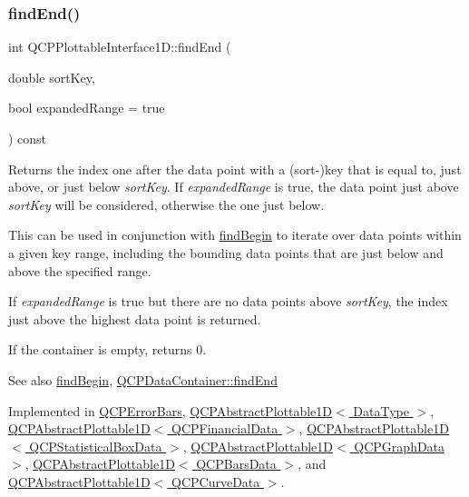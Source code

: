 \subsubsection{\texorpdfstring{find\+End()}{findEnd()}}
{\footnotesize\ttfamily int Q\+C\+P\+Plottable\+Interface1\+D\+::find\+End (\begin{DoxyParamCaption}\item[{double}]{sort\+Key,  }\item[{bool}]{expanded\+Range = {\ttfamily true} }\end{DoxyParamCaption}) const\hspace{0.3cm}{\ttfamily [pure virtual]}}

Returns the index one after the data point with a (sort-\/)key that is equal to, just above, or just below {\itshape sort\+Key}. If {\itshape expanded\+Range} is true, the data point just above {\itshape sort\+Key} will be considered, otherwise the one just below.

This can be used in conjunction with \hyperlink{classQCPPlottableInterface1D_a5b95783271306a4de97be54eac1e7d13}{find\+Begin} to iterate over data points within a given key range, including the bounding data points that are just below and above the specified range.

If {\itshape expanded\+Range} is true but there are no data points above {\itshape sort\+Key}, the index just above the highest data point is returned.

If the container is empty, returns 0.

\begin{DoxySeeAlso}{See also}
\hyperlink{classQCPPlottableInterface1D_a5b95783271306a4de97be54eac1e7d13}{find\+Begin}, \hyperlink{classQCPDataContainer_afb8b8f23cc2b7234a793a25ce79fe48f}{Q\+C\+P\+Data\+Container\+::find\+End} 
\end{DoxySeeAlso}


Implemented in \hyperlink{classQCPErrorBars_ad22dd8499c6d45176ad0651751a0b0b0}{Q\+C\+P\+Error\+Bars}, \hyperlink{classQCPAbstractPlottable1D_a6e3ba20c9160d7361e58070390d10b1a}{Q\+C\+P\+Abstract\+Plottable1\+D$<$ Data\+Type $>$}, \hyperlink{classQCPAbstractPlottable1D_a6e3ba20c9160d7361e58070390d10b1a}{Q\+C\+P\+Abstract\+Plottable1\+D$<$ Q\+C\+P\+Financial\+Data $>$}, \hyperlink{classQCPAbstractPlottable1D_a6e3ba20c9160d7361e58070390d10b1a}{Q\+C\+P\+Abstract\+Plottable1\+D$<$ Q\+C\+P\+Statistical\+Box\+Data $>$}, \hyperlink{classQCPAbstractPlottable1D_a6e3ba20c9160d7361e58070390d10b1a}{Q\+C\+P\+Abstract\+Plottable1\+D$<$ Q\+C\+P\+Graph\+Data $>$}, \hyperlink{classQCPAbstractPlottable1D_a6e3ba20c9160d7361e58070390d10b1a}{Q\+C\+P\+Abstract\+Plottable1\+D$<$ Q\+C\+P\+Bars\+Data $>$}, and \hyperlink{classQCPAbstractPlottable1D_a6e3ba20c9160d7361e58070390d10b1a}{Q\+C\+P\+Abstract\+Plottable1\+D$<$ Q\+C\+P\+Curve\+Data $>$}.

